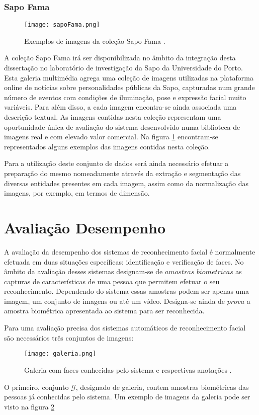 \subsubsection{Sapo Fama}
\begin{figure}[ht]
  \begin{center}
    \leavevmode
    \texttt{[image: sapoFama.png]}
    \caption{Exemplos de imagens da coleção Sapo Fama \cite{PTC2011}.}	
    \label{fig:sapoFama}
  \end{center}
\end{figure}
A coleção Sapo Fama irá ser disponibilizada no âmbito da integração desta dissertação no laboratório de investigação da Sapo da Universidade do Porto. Esta galeria multimédia agrega uma coleção de imagens utilizadas na plataforma online de notícias sobre personalidades públicas da Sapo, capturadas num grande número de eventos com condições de iluminação, pose e expressão facial muito variáveis. Para além disso, a cada imagem encontra-se ainda associada uma descrição textual. As imagens contidas nesta coleção representam uma oportunidade única de avaliação do sistema desenvolvido numa biblioteca de imagens real e com elevado valor comercial. Na figura \ref{fig:sapoFama} encontram-se representados alguns exemplos das imagens contidas nesta coleção.

Para a utilização deste conjunto de dados será ainda necessário efetuar a preparação do mesmo nomeadamente através da extração e segmentação das diversas entidades presentes em cada imagem, assim como da normalização das imagens, por exemplo, em termos de dimensão.

\section{Avaliação Desempenho}
A avaliação da desempenho dos sistemas de reconhecimento facial é normalmente efetuada em duas situações específicas: identificação e verificação de faces. No âmbito da avaliação desses sistemas designam-se de $amostras$ $biometricas$ as capturas de características de uma pessoa que permitem efetuar o seu reconhecimento. Dependendo do sistema essas amostras podem ser apenas uma imagem, um conjunto de imagens ou até um vídeo. Designa-se ainda de $prova$ a amostra biométrica apresentada ao sistema para ser reconhecida.

Para uma avaliação precisa dos sistemas automáticos de reconhecimento facial são necessários três conjuntos de imagens:
\begin{figure}[ht]
  \begin{center}
    \leavevmode
    \texttt{[image: galeria.png]}
    \caption{Galeria com faces conhecidas pelo sistema e respectivas anotações \cite{UniversityofMassachussets}.}	
    \label{fig:galeria}
  \end{center}
\end{figure}
O primeiro, conjunto $\mathscr{G}$, designado de galeria, contem amostras biométricas das pessoas já conhecidas pelo sistema. Um exemplo de imagens da galeria pode ser visto na figura \ref{fig:galeria}

